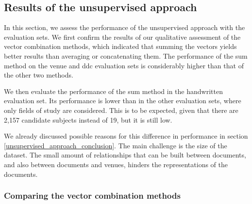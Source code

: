 \subsection{Results of the unsupervised approach}

In this section, we assess the performance of the unsupervised approach with the evaluation sets. We first confirm the results of our qualitative assessment of the vector combination methods, which indicated that summing the vectors yields better results than averaging or concatenating them. The performance of the sum method on the venue and \acrshort{ddc} evaluation sets is considerably higher than that of the other two methods.

We then evaluate the performance of the sum method in the handwritten evaluation set. Its performance is lower than in the other evaluation sets, where only fields of study are considered. This is to be expected, given that there are 2,157 candidate subjects instead of 19, but it is still low.

We already discussed possible reasons for this difference in performance in section \ref{unsupervised_approach_conclusion}. The main challenge is the size of the dataset. The small amount of relationships that can be built between documents, and also between documents and venues, hinders the representations of the documents.

\subsubsection{Comparing the vector combination methods}

